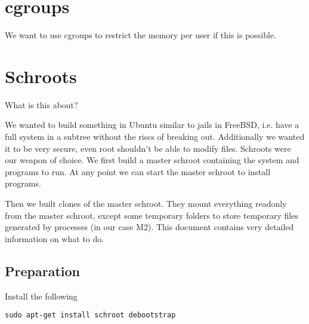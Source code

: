\documentclass[a4paper]{book}
\begin{document}
\chapter{cgroups}
We want to use cgroups to restrict the memory per user if this is possible.
\chapter{Schroots}
What is this about?

We wanted to build something in Ubuntu similar to jails in FreeBSD, i.e. have a
full system in a subtree without the riscs of breaking out.  Additionally we
wanted it to be very secure, even root shouldn't be able to modify files.
Schroots were our weapon of choice. We first build a master schroot containing
the system and programs to run. At any point we can start the master schroot to
install programs.

Then we built clones of the master schroot. They mount everything readonly from
the master schroot, except some temporary folders to store temporary files
generated by processes (in our case M2). This document contains very detailed
information on what to do.

\section{Preparation}

Install the following

\begin{verbatim}
sudo apt-get install schroot debootstrap
\end{verbatim}
\end{document}

